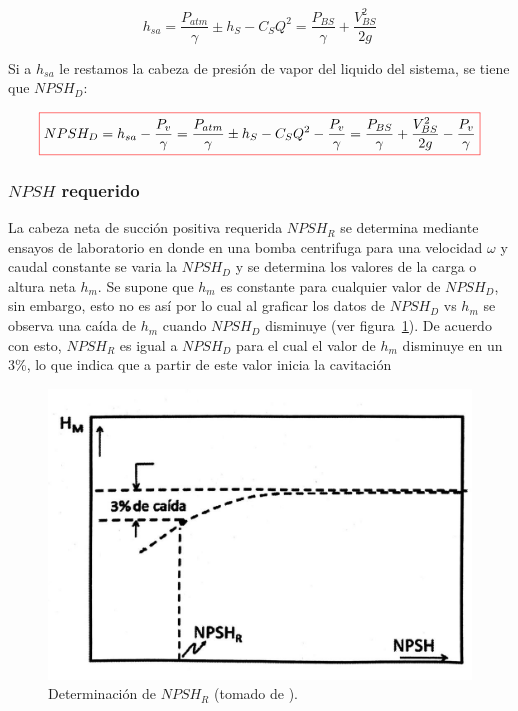 \documentclass[11pt, oneside]{article}
\begin{document}
\begin{equation}
h_{sa} = \frac{P_{atm}}{\gamma} \pm h_S - C_S Q^2 = \frac{P_{BS}}{\gamma} + \frac{V_{BS}^2}{2g} 
\label{boma19}
\end{equation}

Si a $h_{sa}$ le restamos la cabeza de presi\'on de vapor del liquido del sistema, se tiene que $NPSH_D$:

\begin{equation}
\color{red}\boxed{\color{black} NPSH_D = h_{sa} -\frac{P_v}{\gamma} = \frac{P_{atm}}{\gamma} \pm h_S - C_S Q^2 -\frac{P_v}{\gamma} = \frac{P_{BS}}{\gamma} + \frac{V_{BS}^2}{2g} -\frac{P_v}{\gamma}}
\label{boma19}
\end{equation}


\subsubsection*{$NPSH$ requerido}
La cabeza neta de succi\'on positiva requerida  $NPSH_R$ se determina mediante ensayos de laboratorio en donde en una bomba centrifuga para una velocidad $\omega$ y caudal constante se varia la $NPSH_D$ y se determina los valores de la carga o altura neta $h_m$. Se supone que $h_m$ es constante para cualquier valor de $NPSH_D$, sin embargo, esto no es as\'i por lo cual al graficar los datos de $NPSH_D$ vs $h_m$ se observa una ca\'ida de $h_m$ cuando $NPSH_D$ disminuye (ver figura~\ref{bom19}). De acuerdo con esto, $NPSH_R$ es igual a $NPSH_D$ para el cual el valor de $h_m$ disminuye en un 3\%, lo que indica que a partir de este valor inicia la cavitaci\'on

\begin{figure}[h]
\centering
\includegraphics[width=12cm]{./figs/bom19.jpeg}
\caption{Determinaci\'on de $NPSH_R$ (tomado de \cite{agudelo2011mecanica}).} 
\label{bom19}
\end{figure}
\end{document}
